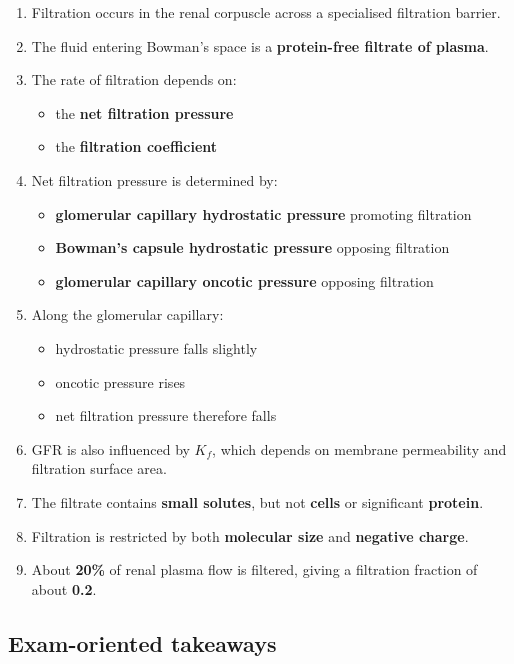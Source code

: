 \documentclass[11pt,a4paper]{article}
\begin{document}
\begin{enumerate}
    \item Filtration occurs in the renal corpuscle across a specialised filtration barrier.
    \item The fluid entering Bowman’s space is a \textbf{protein-free filtrate of plasma}.
    \item The rate of filtration depends on:
    \begin{itemize}
        \item the \textbf{net filtration pressure}
        \item the \textbf{filtration coefficient}
    \end{itemize}
    \item Net filtration pressure is determined by:
    \begin{itemize}
        \item \textbf{glomerular capillary hydrostatic pressure} promoting filtration
        \item \textbf{Bowman’s capsule hydrostatic pressure} opposing filtration
        \item \textbf{glomerular capillary oncotic pressure} opposing filtration
    \end{itemize}
    \item Along the glomerular capillary:
    \begin{itemize}
        \item hydrostatic pressure falls slightly
        \item oncotic pressure rises
        \item net filtration pressure therefore falls
    \end{itemize}
    \item GFR is also influenced by \(K_f\), which depends on membrane permeability and filtration surface area.
    \item The filtrate contains \textbf{small solutes}, but not \textbf{cells} or significant \textbf{protein}.
    \item Filtration is restricted by both \textbf{molecular size} and \textbf{negative charge}.
    \item About \textbf{20\%} of renal plasma flow is filtered, giving a filtration fraction of about \textbf{0.2}.
\end{enumerate}

\subsection{Exam-oriented takeaways}
\end{document}
